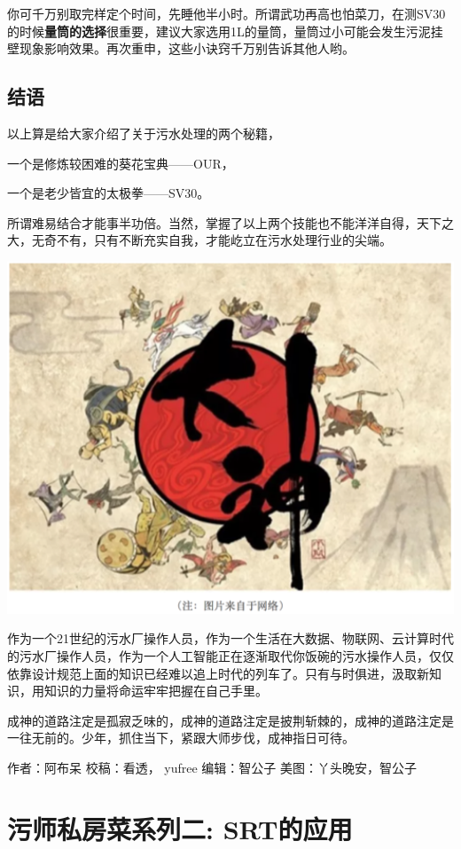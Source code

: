 \documentclass[]{book}
\begin{document}
你可千万别取完样定个时间，先睡他半小时。所谓武功再高也怕菜刀，在测SV30的时候\textbf{量筒的选择}很重要，建议大家选用1L的量筒，量筒过小可能会发生污泥挂壁现象影响效果。再次重申，这些小诀窍千万别告诉其他人哟。

\hypertarget{ux7ed3ux8bed}{%
\subsection{结语}\label{ux7ed3ux8bed}}

以上算是给大家介绍了关于污水处理的两个秘籍，

一个是修炼较困难的葵花宝典------OUR，

一个是老少皆宜的太极拳------SV30。

所谓难易结合才能事半功倍。当然，掌握了以上两个技能也不能洋洋自得，天下之大，无奇不有，只有不断充实自我，才能屹立在污水处理行业的尖端。

\includegraphics[width=6.67in]{images/os4}

作为一个21世纪的污水厂操作人员，作为一个生活在大数据、物联网、云计算时代的污水厂操作人员，作为一个人工智能正在逐渐取代你饭碗的污水操作人员，仅仅依靠设计规范上面的知识已经难以追上时代的列车了。只有与时俱进，汲取新知识，用知识的力量将命运牢牢把握在自己手里。

成神的道路注定是孤寂乏味的，成神的道路注定是披荆斩棘的，成神的道路注定是一往无前的。少年，抓住当下，紧跟大师步伐，成神指日可待。

作者：阿布呆
校稿：看透， yufree
编辑：智公子
美图：丫头晚安，智公子

\hypertarget{ux6c61ux5e08ux79c1ux623fux83dcux7cfbux5217ux4e8c-srtux7684ux5e94ux7528}{%
\section{污师私房菜系列二: SRT的应用}\label{ux6c61ux5e08ux79c1ux623fux83dcux7cfbux5217ux4e8c-srtux7684ux5e94ux7528}}
\end{document}

